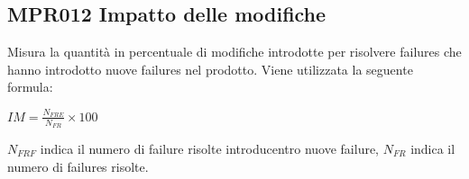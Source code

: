 \subsection{MPR012 Impatto delle modifiche}
Misura la quantità in percentuale di modifiche introdotte per risolvere failures che hanno introdotto nuove failures nel prodotto. Viene utilizzata la seguente formula:
\begin{center}{$IM=\frac{N_{FRE}}{N_{FR}}\times 100 $}\end{center}
${N_{FRF}}$ indica il numero di failure risolte introducentro nuove failure, ${N_{FR}}$ indica il numero di failures risolte.


